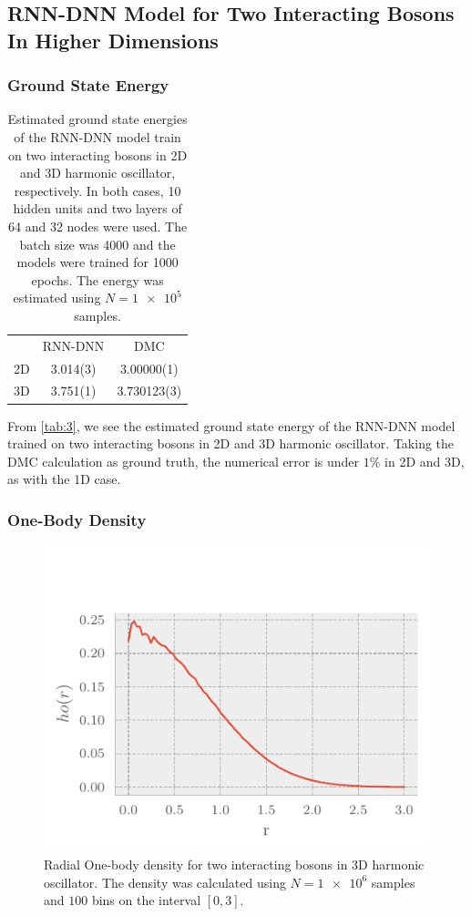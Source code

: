 \subsection{RNN-DNN Model for Two Interacting Bosons In Higher Dimensions}

\subsubsection{Ground State Energy}

\begin{table}[ht]
	\begin{tabular}{r|SS}
		\toprule
		      & {RNN-DNN}   & {DMC\cite{samseth2019learning}}     \\
		2D    & 3.014(3)  &  3.00000(1) \\
		3D    & 3.751(1)  &   3.730123(3) \\
		\bottomrule
	\end{tabular}
	\caption{Estimated ground state energies of the RNN-DNN model train on two interacting bosons in 2D and 3D harmonic oscillator, respectively. In both cases, 10 hidden units and two layers of 64 and 32 nodes were used. The batch size was 4000 and the models were trained for 1000 epochs. The energy was estimated using $N=\num{1e5}$ samples.}
	\label{tab:3}
\end{table}

From \autoref{tab:3}, we see the estimated ground state energy of the RNN-DNN model trained on two interacting bosons in 2D and 3D harmonic oscillator. Taking the DMC calculation as ground truth, the numerical error is under $1\%$ in 2D and 3D, as with the 1D case. 

\subsubsection{One-Body Density}
\begin{figure}[H]
	\includegraphics[]{figures/many_part_3D.pdf}
	\caption{Radial One-body density for two interacting bosons in 3D harmonic
      oscillator. The density was calculated using $N=\num{1e6}$ samples and $100$
      bins on the interval $[0,3]$.} 
	\label{fig:many_part_3D}
\end{figure}

